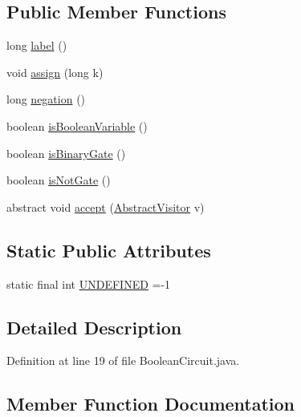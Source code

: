 \subsection*{Public Member Functions}
\begin{DoxyCompactItemize}
\item 
long \hyperlink{classuran_1_1formula_1_1cnf_1_1_boolean_circuit_ae555af28a0fe4854b044ac7c03f2900a}{label} ()
\item 
void \hyperlink{classuran_1_1formula_1_1cnf_1_1_boolean_circuit_ab54aa4d58efb76b3036ecc7c364c3965}{assign} (long k)
\item 
long \hyperlink{classuran_1_1formula_1_1cnf_1_1_boolean_circuit_ac32a42c7cf395447b5d093c40f5ddb60}{negation} ()
\item 
boolean \hyperlink{classuran_1_1formula_1_1cnf_1_1_boolean_circuit_a391d1368a9278df4a09852df1c696c59}{is\+Boolean\+Variable} ()
\item 
boolean \hyperlink{classuran_1_1formula_1_1cnf_1_1_boolean_circuit_ae935b68b31baa8998267dbd9d3e8b790}{is\+Binary\+Gate} ()
\item 
boolean \hyperlink{classuran_1_1formula_1_1cnf_1_1_boolean_circuit_a57d155d7d00066d0fcc057c9f57ec669}{is\+Not\+Gate} ()
\item 
abstract void \hyperlink{classuran_1_1formula_1_1cnf_1_1_boolean_circuit_aef2638857ae58fb05b6db1eb2be25565}{accept} (\hyperlink{classuran_1_1formula_1_1cnf_1_1visitor_1_1_abstract_visitor}{Abstract\+Visitor} v)
\end{DoxyCompactItemize}
\subsection*{Static Public Attributes}
\begin{DoxyCompactItemize}
\item 
static final int \hyperlink{classuran_1_1formula_1_1cnf_1_1_boolean_circuit_a390c29de655dcf8134ad839d29d6192c}{U\+N\+D\+E\+F\+I\+N\+E\+D} =-\/1
\end{DoxyCompactItemize}


\subsection{Detailed Description}


Definition at line 19 of file Boolean\+Circuit.\+java.



\subsection{Member Function Documentation}
\hypertarget{classuran_1_1formula_1_1cnf_1_1_boolean_circuit_aef2638857ae58fb05b6db1eb2be25565}{}
